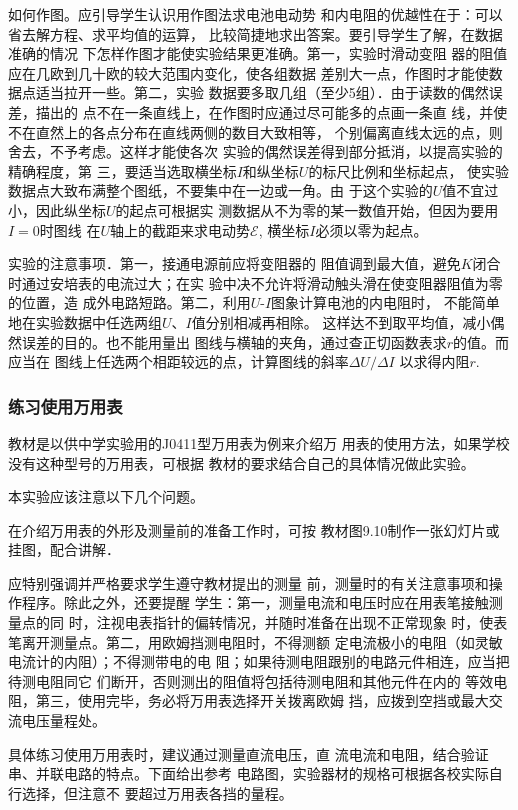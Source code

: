 如何作图。应引导学生认识用作图法求电池电动势
和内电阻的优越性在于：可以省去解方程、求平均值的运算，
比较简捷地求出答案。要引导学生了解，在数据准确的情况
下怎样作图才能使实验结果更准确。第一，实验时滑动变阻
器的阻值应在几欧到几十欧的较大范围内变化，使各组数据
差别大一点，作图时才能使数据点适当拉开一些。第二，实验
数据要多取几组（至少5组）．由于读数的偶然误差，描出的
点不在一条直线上，在作图时应通过尽可能多的点画一条直
线，并使不在直然上的各点分布在直线两侧的数目大致相等，
个别偏离直线太远的点，则舍去，不予考虑。这样才能使各次
实验的偶然误差得到部分抵消，以提高实验的精确程度，第
三，要适当选取横坐标$I$和纵坐标$U$的标尺比例和坐标起点，
使实验数据点大致布满整个图纸，不要集中在一边或一角。由
于这个实验的$U$值不宜过小，因此纵坐标$U$的起点可根据实
测数据从不为零的某一数值开始，但因为要用$I=0$时图线
在$U$轴上的截距来求电动势$\mathcal{E}$, 横坐标$I$必须以零为起点。

实验的注意事项．第一，接通电源前应将变阻器的
阻值调到最大值，避免$K$闭合时通过安培表的电流过大；在实
验中决不允许将滑动触头滑在使变阻器阻值为零的位置，造
成外电路短路。第二，利用$U$-$I$图象计算电池的内电阻时，
不能简单地在实验数据中任选两组$U$、$I$值分别相减再相除。
这样达不到取平均值，减小偶然误差的目的。也不能用量出
图线与横轴的夹角，通过查正切函数表求$r$的值。而应当在
图线上任选两个相距较远的点，计算图线的斜率$\Delta U/\Delta I$
以求得内阻$r$.


\subsubsection{练习使用万用表}
教材是以供中学实验用的J0411型万用表为例来介绍万
用表的使用方法，如果学校没有这种型号的万用表，可根据
教材的要求结合自己的具体情况做此实验。

本实验应该注意以下几个问题。

在介绍万用表的外形及测量前的准备工作时，可按
教材图9.10制作一张幻灯片或挂图，配合讲解．

应特别强调并严格要求学生遵守教材提出的测量
前，测量时的有关注意事项和操作程序。除此之外，还要提醒
学生：第一，测量电流和电压时应在用表笔接触测量点的同
时，注视电表指针的偏转情况，并随时准备在出现不正常现象
时，使表笔离开测量点。第二，用欧姆挡测电阻时，不得测额
定电流极小的电阻（如灵敏电流计的内阻）；不得测带电的电
阻；如果待测电阻跟别的电路元件相连，应当把待测电阻同它
们断开，否则测出的阻值将包括待测电阻和其他元件在内的
等效电阻，第三，使用完毕，务必将万用表选择开关拨离欧姆
挡，应拨到空挡或最大交流电压量程处。

具体练习使用万用表时，建议通过测量直流电压，直
流电流和电阻，结合验证串、并联电路的特点。下面给出参考
电路图，实验器材的规格可根据各校实际自行选择，但注意不
要超过万用表各挡的量程。

